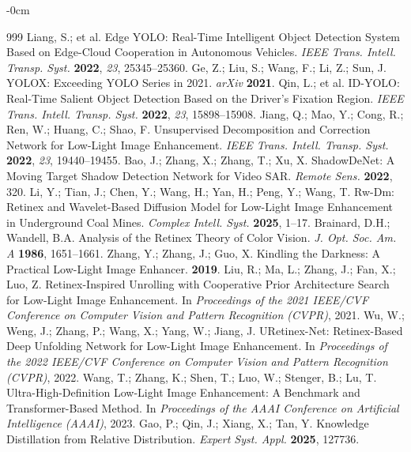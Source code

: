 \documentclass[sensors,article,submit,moreauthors]{Definitions/mdpi}
\begin{document}
\begin{adjustwidth}{-\extralength}{0cm}

\begin{thebibliography}{999}
 Liang, S.; et al. Edge YOLO: Real-Time Intelligent Object Detection System Based on Edge-Cloud Cooperation in Autonomous Vehicles. \textit{IEEE Trans. Intell. Transp. Syst.} \textbf{2022}, \textit{23}, 25345--25360.
 Ge, Z.; Liu, S.; Wang, F.; Li, Z.; Sun, J. YOLOX: Exceeding YOLO Series in 2021. \textit{arXiv} \textbf{2021}.
 Qin, L.; et al. ID-YOLO: Real-Time Salient Object Detection Based on the Driver's Fixation Region. \textit{IEEE Trans. Intell. Transp. Syst.} \textbf{2022}, \textit{23}, 15898--15908.
 Jiang, Q.; Mao, Y.; Cong, R.; Ren, W.; Huang, C.; Shao, F. Unsupervised Decomposition and Correction Network for Low-Light Image Enhancement. \textit{IEEE Trans. Intell. Transp. Syst.} \textbf{2022}, \textit{23}, 19440--19455.
 Bao, J.; Zhang, X.; Zhang, T.; Xu, X. ShadowDeNet: A Moving Target Shadow Detection Network for Video SAR. \textit{Remote Sens.} \textbf{2022}, 320.
 Li, Y.; Tian, J.; Chen, Y.; Wang, H.; Yan, H.; Peng, Y.; Wang, T. Rw-Dm: Retinex and Wavelet-Based Diffusion Model for Low-Light Image Enhancement in Underground Coal Mines. \textit{Complex Intell. Syst.} \textbf{2025}, 1--17.
 Brainard, D.H.; Wandell, B.A. Analysis of the Retinex Theory of Color Vision. \textit{J. Opt. Soc. Am. A} \textbf{1986}, 1651--1661.
 Zhang, Y.; Zhang, J.; Guo, X. Kindling the Darkness: A Practical Low-Light Image Enhancer. \textbf{2019}.
 Liu, R.; Ma, L.; Zhang, J.; Fan, X.; Luo, Z. Retinex-Inspired Unrolling with Cooperative Prior Architecture Search for Low-Light Image Enhancement. In \textit{Proceedings of the 2021 IEEE/CVF Conference on Computer Vision and Pattern Recognition (CVPR)}, 2021.
 Wu, W.; Weng, J.; Zhang, P.; Wang, X.; Yang, W.; Jiang, J. URetinex-Net: Retinex-Based Deep Unfolding Network for Low-Light Image Enhancement. In \textit{Proceedings of the 2022 IEEE/CVF Conference on Computer Vision and Pattern Recognition (CVPR)}, 2022.
 Wang, T.; Zhang, K.; Shen, T.; Luo, W.; Stenger, B.; Lu, T. Ultra-High-Definition Low-Light Image Enhancement: A Benchmark and Transformer-Based Method. In \textit{Proceedings of the AAAI Conference on Artificial Intelligence (AAAI)}, 2023.
 Gao, P.; Qin, J.; Xiang, X.; Tan, Y. Knowledge Distillation from Relative Distribution. \textit{Expert Syst. Appl.} \textbf{2025}, 127736.

\end{thebibliography}
\end{adjustwidth}
\end{document}
